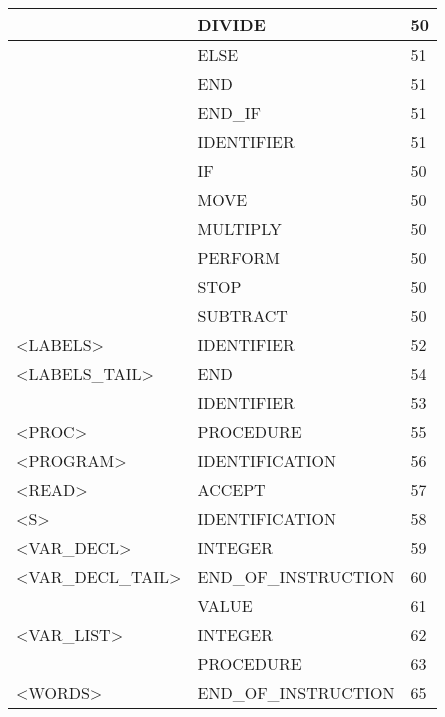 \begin{longtable}{|l|l|l|}
                     &   DIVIDE               &   50 \\ \hline
                     &   ELSE                 &   51 \\ \hline
                     &   END                  &   51 \\ \hline
                     &   END\_IF              &   51 \\ \hline
                     &   IDENTIFIER           &   51 \\ \hline
                     &   IF                   &   50 \\ \hline
                     &   MOVE                 &   50 \\ \hline
                     &   MULTIPLY             &   50 \\ \hline
                     &   PERFORM              &   50 \\ \hline
                     &   STOP                 &   50 \\ \hline
                     &   SUBTRACT             &   50 \\ \hline
<LABELS>                                 &   IDENTIFIER           &   52 \\ \hline
<LABELS\_TAIL>                           &   END                  &   54 \\ \hline
                     &   IDENTIFIER           &   53 \\ \hline
<PROC>                                   &   PROCEDURE            &   55 \\ \hline
<PROGRAM>                                &   IDENTIFICATION       &   56 \\ \hline
<READ>                                   &   ACCEPT               &   57 \\ \hline
<S>                                      &   IDENTIFICATION       &   58 \\ \hline
<VAR\_DECL>                              &   INTEGER              &   59 \\ \hline
<VAR\_DECL\_TAIL>                        &   END\_OF\_INSTRUCTION &   60 \\ \hline
                     &   VALUE                &   61 \\ \hline
<VAR\_LIST>                              &   INTEGER              &   62 \\ \hline
                     &   PROCEDURE            &   63 \\ \hline
<WORDS>                                  &   END\_OF\_INSTRUCTION &   65 \\ \hline

\end{longtable}
